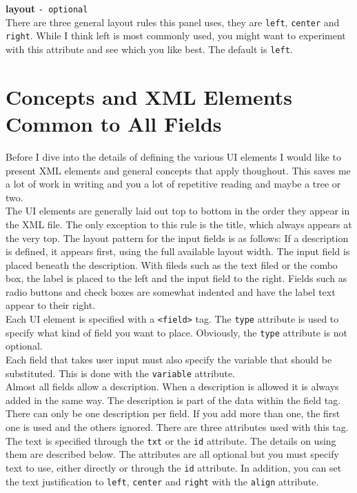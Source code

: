 \textbf{layout} \texttt{- optional}\\

There are three general layout rules this panel uses, they are
\texttt{left}, \texttt{center} and \texttt{right}. While I think left is
most commonly used, you might want to experiment with this attribute and
see which you like best. The default is \texttt{left}.\\


\section{Concepts and XML Elements Common to All Fields}

Before I dive into the details of defining the various UI elements I
would like to present XML elements and general concepts that apply
thoughout. This saves me a lot of work in writing and you a lot of
repetitive reading and maybe a tree or two.\\

The UI elements are generally laid out top to bottom in the order they
appear in the XML file. The only exception to this rule is the title,
which always appears at the very top. The layout pattern for the input
fields is as follows: If a description is defined, it appears first,
using the full available layout width. The input field is placed beneath
the description. With fileds such as the text filed or the combo box,
the label is placed to the left and the input field to the right. Fields
such as radio buttons and check boxes are somewhat indented and have the
label text appear to their right.\\

Each UI element is specified with a \texttt{<field>} tag. The
\texttt{type} attribute is used to specify what kind of field you want
to place. Obviously, the \texttt{type} attribute is not optional.\\

Each field that takes user input must also specify the variable that
should be substituted. This is done with the \texttt{variable}
attribute.\\

Almost all fields allow a description. When a description is allowed it
is always added in the same way. The description is part of the data
within the field tag. There can only be one description per field. If
you add more than one, the first one is used and the others ignored.
There are three attributes used with this tag. The text is specified
through the \texttt{txt} or the \texttt{id} attribute. The details on
using them are described below. The attributes are all optional but you
must specify text to use, either directly or through the \texttt{id}
attribute. In addition, you can set the text justification to
\texttt{left}, \texttt{center} and \texttt{right} with the
\texttt{align} attribute. \\

